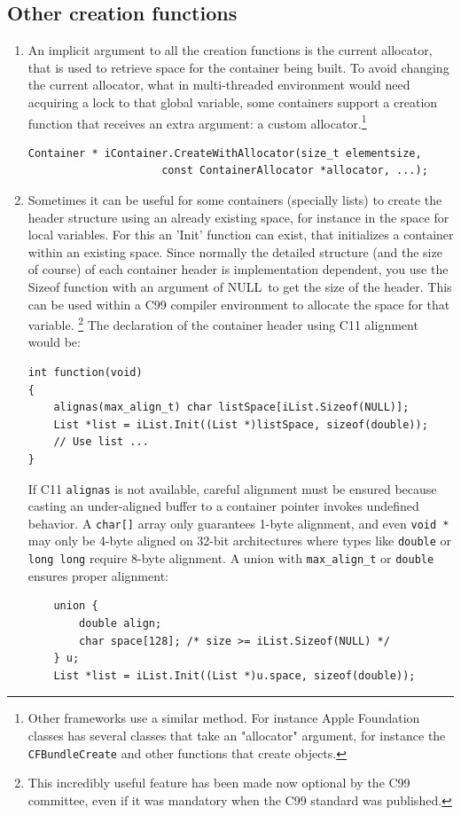 \documentclass[12pt,a4paper,openany]{memoir} %
\newif\iftth
\newcommand{\Null}{{\iftth \ NULL \else \footnotesize NULL\  \fi}}
\begin{document}
\subsection{Other creation functions}
\begin{enumerate}
\item
An implicit argument to all the creation functions is the current allocator, that is used to retrieve space for the container being built. To avoid changing the current allocator, what in multi-threaded environment would need acquiring a lock to that global variable, some containers support a creation function that receives an extra argument: a custom allocator.\footnote{
Other frameworks use a similar method. For instance Apple Foundation classes has several classes that take an "allocator" argument, for instance the
\texttt{CFBundleCreate} and other functions that create objects.
}
\begin{verbatim}
Container * iContainer.CreateWithAllocator(size_t elementsize,
                     const ContainerAllocator *allocator, ...);
\end{verbatim}
\item
Sometimes it can be useful for some containers (specially lists) to create the  header structure using an already existing space, for instance in the space for local variables. For this an 'Init' function can exist, that initializes a container within an existing space.
Since normally the detailed structure (and the size of course) of each container header is implementation dependent, you use the Sizeof function with an argument of \Null to get the size of the header. This can be used within a C99 compiler environment to allocate the space for that variable.
\footnote{This incredibly useful feature has been made now optional by the C99 committee, even if it was mandatory when the C99 standard was published.}
The declaration of the container header using C11 alignment would be:
\begin{verbatim}
int function(void)
{
    alignas(max_align_t) char listSpace[iList.Sizeof(NULL)];
    List *list = iList.Init((List *)listSpace, sizeof(double));
    // Use list ...
}
\end{verbatim}

If C11 \texttt{alignas} is not available, careful alignment must be ensured because casting an under-aligned buffer to a container pointer invokes undefined behavior. A \texttt{char[]} array only guarantees 1-byte alignment, and even \texttt{void *} may only be 4-byte aligned on 32-bit architectures where types like \texttt{double} or \texttt{long long} require 8-byte alignment. A union with \texttt{max\_align\_t} or \texttt{double} ensures proper alignment:
\begin{verbatim}
    union {
        double align;
        char space[128]; /* size >= iList.Sizeof(NULL) */
    } u;
    List *list = iList.Init((List *)u.space, sizeof(double));
\end{verbatim}


\end{enumerate}
\end{document}
